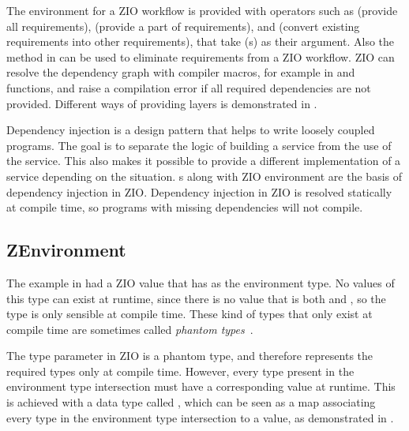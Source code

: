 

The environment for a ZIO workflow is provided with operators such as  (provide all requirements),  (provide a part of requirements), and  (convert existing requirements into other requirements), that take (s) as their argument. Also the  method in  can be used to eliminate requirements from a ZIO workflow. ZIO can resolve the dependency graph with compiler macros, for example in  and  functions, and raise a compilation error if all required dependencies are not provided. Different ways of providing layers is demonstrated in .



Dependency injection is a design pattern that helps to write loosely coupled programs. The goal is to separate the logic of building a service from the use of the service. This also makes it possible to provide a different implementation of a service depending on the situation. s along with ZIO environment are the basis of dependency injection in ZIO. Dependency injection in ZIO is resolved statically at compile time, so programs with missing dependencies will not compile.


\subsection{ZEnvironment}
The example in  had a ZIO value  that has  as the environment type. No values of this type can exist at runtime, since there is no value that is both  and , so the type is only sensible at compile time. These kind of types that only exist at compile time are sometimes called \textit{phantom types}~\cite{fun-phantom-types}.

The  type parameter in ZIO is a phantom type, and therefore represents the required types only at compile time. However, every type present in the environment type intersection must have a corresponding value at runtime. This is achieved with a data type called , which can be seen as a map associating every type in the environment type intersection to a value, as demonstrated in .


